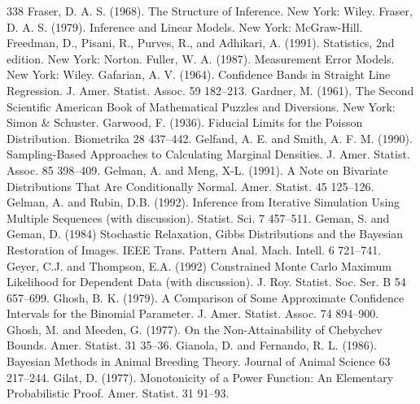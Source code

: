 \begin{thebibliography}{338}
\label{bib:source127} Fraser, D. A. S. (1968). The Structure of Inference. New York: Wiley.
\label{bib:source128} Fraser, D. A. S. (1979). Inference and Linear Models. New York: McGraw-Hill.
\label{bib:source129} Freedman, D., Pisani, R., Purves, R., and Adhikari, A. (1991). Statistics, 2nd edition. New York: Norton.
\label{bib:source130} Fuller, W. A. (1987). Measurement Error Models. New York: Wiley.
\label{bib:source131} Gafarian, A. V. (1964). Confidence Bands in Straight Line Regression. J. Amer. Statist. Assoc. 59 182–213.
\label{bib:source132} Gardner, M. (1961). The Second Scientific American Book of Mathematical Puzzles and Diversions. New York: Simon \& Schuster.
\label{bib:source133} Garwood, F. (1936). Fiducial Limits for the Poisson Distribution. Biometrika 28 437–442.
\label{bib:source134} Gelfand, A. E. and Smith, A. F. M. (1990). Sampling-Based Approaches to Calculating Marginal Densities. J. Amer. Statist. Assoc. 85 398–409.
\label{bib:source135} Gelman, A. and Meng, X-L. (1991). A Note on Bivariate Distributions That Are Conditionally Normal. Amer. Statist. 45 125–126.
\label{bib:source136} Gelman, A. and Rubin, D.B. (1992). Inference from Iterative Simulation Using Multiple Sequences (with discussion). Statist. Sci. 7 457–511.
\label{bib:source137} Geman, S. and Geman, D. (1984) Stochastic Relaxation, Gibbs Distributions and the Bayesian Restoration of Images. IEEE Trans. Pattern Anal. Mach. Intell. 6 721–741.
\label{bib:source138} Geyer, C.J. and Thompson, E.A. (1992) Constrained Monte Carlo Maximum Likelihood for Dependent Data (with discussion). J. Roy. Statist. Soc. Ser. B 54 657–699.
\label{bib:source139} Ghosh, B. K. (1979). A Comparison of Some Approximate Confidence Intervals for the Binomial Parameter. J. Amer. Statist. Assoc. 74 894–900.
\label{bib:source140} Ghosh, M. and Meeden, G. (1977). On the Non-Attainability of Chebychev Bounds. Amer. Statist. 31 35–36.
\label{bib:source141} Gianola, D. and Fernando, R. L. (1986). Bayesian Methods in Animal Breeding Theory. Journal of Animal Science 63 217–244.
\label{bib:source142} Gilat, D. (1977). Monotonicity of a Power Function: An Elementary Probabilistic Proof. Amer. Statist. 31 91–93.

\end{thebibliography}
